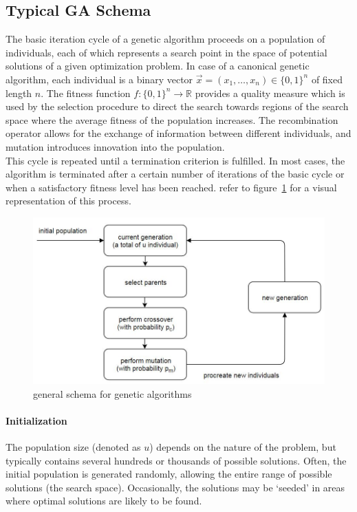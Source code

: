 \documentclass[12pt]{article}
\begin{document}
\subsection{Typical GA Schema}
The basic iteration cycle of a genetic algorithm proceeds on a population
of individuals, each of which represents a search point in the space
of potential solutions of a given optimization problem.
In case of a canonical genetic algorithm, each individual is a binary vector
$ \vec{x} = ( x_1, \dots, x_n ) \in \{0, 1\}^n $
of fixed length $n$. The fitness function
$ f: \{0, 1\}^n \rightarrow \mathbb{R} $
provides a quality measure which is used by the selection procedure to direct
the search towards regions of the search space where the
average fitness of the population increases. The recombination operator
allows for the exchange of information between different individuals, and
mutation introduces innovation into the population. \\
This cycle is repeated until a termination criterion is fulfilled.
In most cases, the algorithm is terminated after a certain number of
iterations of the basic cycle or when a satisfactory fitness
level has been reached.
refer to figure~\ref{fig:ga} for a visual representation of this process.

\begin{figure}[!htbp]
\centering
\includegraphics[width=1\textwidth]{ga}
\caption{general schema for genetic algorithms}
\label{fig:ga}
\end{figure}


\paragraph{Initialization}
The population size (denoted as $u$) depends on the nature of the problem,
but typically contains several hundreds or thousands of possible solutions.
Often, the initial population is generated randomly, allowing the entire range
of possible solutions (the search space).
Occasionally, the solutions may be `seeded' in areas where optimal solutions
are likely to be found.
\end{document}
